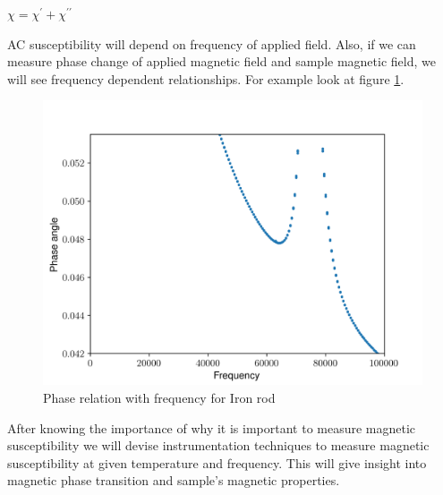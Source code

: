 $\chi= \chi^\prime +\chi^{\prime\prime}$

AC susceptibility will depend on frequency of applied field. Also, if we can measure phase change of applied magnetic field and sample magnetic field, we will see frequency dependent relationships. For example look at figure \ref{fig:phaserel}.

\begin{figure}
\includegraphics[width=\linewidth]{phaserel.png}
\caption{Phase relation with frequency for Iron rod}
\label{fig:phaserel}
\end{figure}

After knowing the importance of why it is important to measure magnetic susceptibility we will devise instrumentation techniques to measure magnetic susceptibility at given temperature and frequency. This will give insight into magnetic phase transition and sample's magnetic properties.



